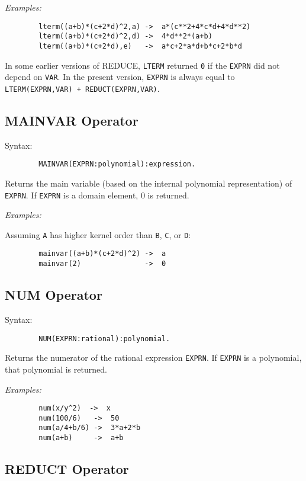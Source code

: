 \textit{Examples:}
\begin{verbatim}
        lterm((a+b)*(c+2*d)^2,a) ->  a*(c**2+4*c*d+4*d**2)
        lterm((a+b)*(c+2*d)^2,d) ->  4*d**2*(a+b)
        lterm((a+b)*(c+2*d),e)   ->  a*c+2*a*d+b*c+2*b*d
\end{verbatim}

{\COMPATNOTE} In some earlier versions of REDUCE, \texttt{LTERM} returned
\texttt{0} if the \texttt{EXPRN} did not depend on \texttt{VAR}.  In the present
version, \texttt{EXPRN} is always equal to 
\texttt{LTERM(EXPRN,VAR) + REDUCT(EXPRN,VAR)}.

\subsection{MAINVAR Operator}
\hypertarget{operator:MAINVAR}{}

Syntax:
\begin{verbatim}
        MAINVAR(EXPRN:polynomial):expression.
\end{verbatim}
Returns the main variable (based on the internal polynomial representation)
of \texttt{EXPRN}. If \texttt{EXPRN} is a domain element, 0 is returned.

\textit{Examples:}

Assuming \texttt{A} has higher kernel order than \texttt{B}, \texttt{C}, or \texttt{D}:
\begin{verbatim}
        mainvar((a+b)*(c+2*d)^2) ->  a
        mainvar(2)               ->  0
\end{verbatim}

\subsection{NUM Operator}
\hypertarget{operator:NUM}{}

Syntax:
\begin{verbatim}
        NUM(EXPRN:rational):polynomial.
\end{verbatim}
Returns the numerator of the rational expression \texttt{EXPRN}.  If \texttt{EXPRN}
is a polynomial, that polynomial is returned.

\textit{Examples:}
\begin{verbatim}
        num(x/y^2)  ->  x
        num(100/6)   ->  50
        num(a/4+b/6) ->  3*a+2*b
        num(a+b)     ->  a+b
\end{verbatim}

\subsection{REDUCT Operator}
\hypertarget{operator:REDUCT}{}

